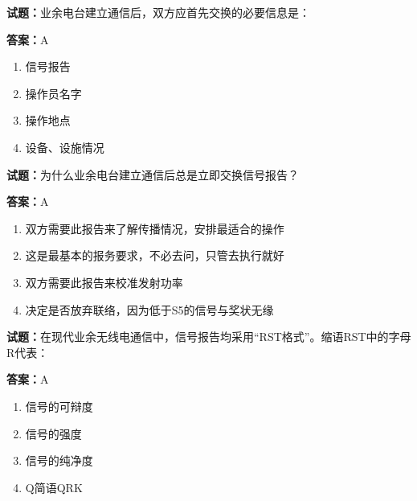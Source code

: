 \documentclass{ctexbook}
\begin{document}
\textbf{试题：}业余电台建立通信后，双方应首先交换的必要信息是： 

\textbf{答案：}A 

\begin{enumerate}[leftmargin=3em]
  \item 信号报告 

  \item 操作员名字 

  \item 操作地点 

  \item 设备、设施情况 

\end{enumerate}





\vspace{1em}

\textbf{试题：}为什么业余电台建立通信后总是立即交换信号报告？ 

\textbf{答案：}A 

\begin{enumerate}[leftmargin=3em]
  \item 双方需要此报告来了解传播情况，安排最适合的操作 

  \item 这是最基本的报务要求，不必去问，只管去执行就好 

  \item 双方需要此报告来校准发射功率 

  \item 决定是否放弃联络，因为低于S5的信号与奖状无缘 


\end{enumerate}





\vspace{1em}

\textbf{试题：}在现代业余无线电通信中，信号报告均采用“RST格式”。缩语RST中的字母R代表： 

\textbf{答案：}A 

\begin{enumerate}[leftmargin=3em]
  \item 信号的可辩度 

  \item 信号的强度 

  \item 信号的纯净度 

  \item Q简语QRK 

\end{enumerate}
\end{document}

